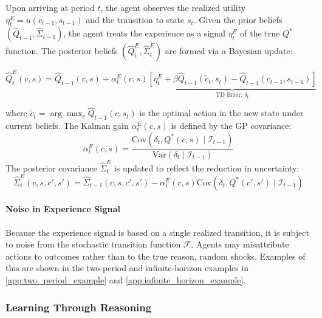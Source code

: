 \begin{definition} \label{def:experience_learning_update}
    Upon arriving at period $t$, the agent observes the realized utility 
    $\eta^E_t = u(c_{t-1}, s_{t-1})$ and the transition to state $s_t$. Given the prior 
    beliefs $(\hat{Q}_{t-1}, \hat{\Sigma}_{t-1})$, the agent treats the experience as a 
    signal $\eta^E_t$ of the true $Q^*$ function. The posterior beliefs 
    $(\hat{Q}^E_t, \hat{\Sigma}^E_t)$ are formed via a Bayesian update:

    \begin{equation}
        \hat{Q}^E_t(c,s) = \hat{Q}_{t-1}(c,s) + \alpha^E_t(c,s) \underbrace{\left[ \eta^E_t + \beta \hat{Q}_{t-1}(\tilde{c}_t, s_t) - \hat{Q}_{t-1}(c_{t-1}, s_{t-1}) \right]}_{\text{TD Error: } \delta_t}
    \end{equation}

    where $\tilde{c}_t = \arg\max_{c} \hat{Q}_{t-1}(c, s_t)$ is the optimal action in the new state under current beliefs. The Kalman gain $\alpha^E_t(c,s)$ is defined by the GP covariance:
    \begin{equation}
        \alpha^E_t(c,s) = \frac{\text{Cov}(\delta_t, Q^*(c,s) \mid \mathcal{I}_{t-1})}{\text{Var}(\delta_t \mid \mathcal{I}_{t-1})}
    \end{equation}
    The posterior covariance $\hat{\Sigma}^E_t$ is updated to reflect the reduction in uncertainty:
    \begin{equation}
        \hat{\Sigma}^E_t(c,s,c',s') = \hat{\Sigma}_{t-1}(c,s,c',s') - \alpha^E_t(c,s) \text{Cov}(\delta_t, Q^*(c',s') \mid \mathcal{I}_{t-1})
    \end{equation}
\end{definition}

\paragraph{Noise in Experience Signal} Because the experience signal is based on a single realized transition, it is subject
to noise from the stochastic transition function $\mathcal{F}$. Agents may
misattribute actions to outcomes rather than to the true reason, random shocks. Examples
of this are shown in the two-period and infinite-horizon examples in \ref{app:two_period_example} and \ref{app:infinite_horizon_example}.

\subsubsection{Learning Through Reasoning}

